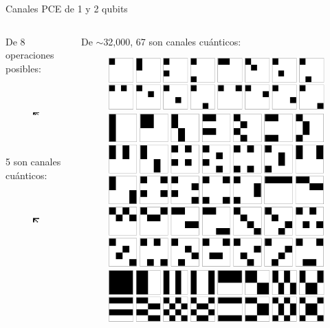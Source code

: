 \documentclass[xcolor=dvipsnames,presentation]{beamer}%
\begin{document}
\begin{frame}{Canales PCE de 1 y 2 qubits}
\begin{columns}
\begin{column}{0.4\textwidth}
De 8 operaciones posibles:
\begin{figure}
\includegraphics[height=2.2cm]{1qubitPCE}
\end{figure}
5 son canales cuánticos:
\begin{figure}
\includegraphics[height=2.2cm]{1qubit}
\end{figure}
\end{column} 
\begin{column}{0.6\textwidth}
De $\sim$32,000, 67 son canales cuánticos:
\begin{figure}
\includegraphics[width=.9\textwidth]{2qubits_01}\\
\includegraphics[width=.9\textwidth]{2qubits_02}\\
\includegraphics[width=.9\textwidth]{2qubits_03}
\end{figure}
\end{column}
\end{columns}
\end{frame}
\end{document}
